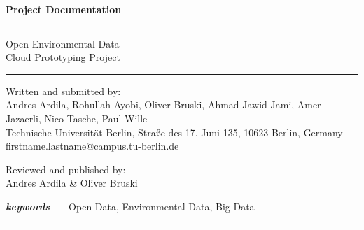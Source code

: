 \documentclass{article}
\providecommand{\keywords}[1]{\textbf{\textit{keywords ---}} #1}
\begin{document}

\thispagestyle{empty}
\begin{flushleft}
\LARGE{\bfseries Project Documentation}\\
\end{flushleft}
\rule{\textwidth}{1pt}
\vspace{2pt}
\begin{flushleft}
\Huge{Open Environmental Data} \\
\huge{Cloud Prototyping Project} \\
\end{flushleft}
\rule{\textwidth}{1pt}


\newpage
\thispagestyle{empty}
\clearpage

\begin{center}
\Large{Written and submitted by:}\\
\vspace*{2mm}
\normalsize
Andres Ardila, Rohullah Ayobi, Oliver Bruski, Ahmad Jawid Jami, Amer Jazaerli, Nico Tasche, Paul Wille\\
\vspace*{7mm}
Technische Universit\"at Berlin, Stra\ss{}e des 17. Juni 135, 10623 Berlin, Germany\\
firstname.lastname@campus.tu-berlin.de
\end{center}

\vspace*{8mm}
\begin{center}
	\Large{Reviewed and published by:}\\
	\vspace*{2mm}
	\normalsize
	Andres Ardila \& Oliver Bruski
\end{center}

\keywords{Open Data, Environmental Data, Big Data}

\vspace*{1mm}
\rule{\textwidth}{1pt}
\vspace*{1mm}
\end{document}
